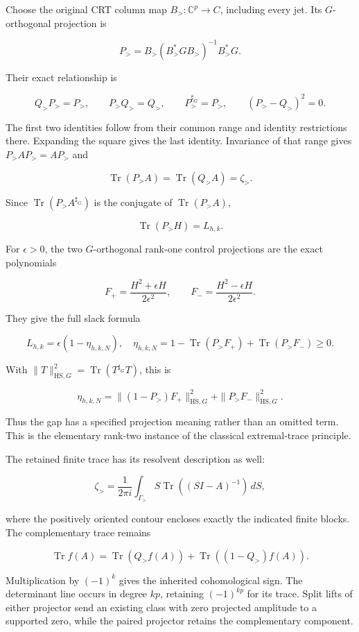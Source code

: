 \documentclass[
  11pt,
]{article}
\begin{document}
Choose the original CRT column map \(B_{>}:\mathbb C^p\to C\), including
every jet. Its \(G\)-orthogonal projection is

\[
\boxed{
P_{>}=B_{>}(B_{>}^*GB_{>})^{-1}B_{>}^*G.
}
\]

Their exact relationship is

\[
Q_{>}P_{>}=P_{>},\qquad P_{>}Q_{>}=Q_{>},\qquad
P_{>}^{\sharp_G}=P_{>},\qquad(P_{>}-Q_{>})^2=0.
\]

The first two identities follow from their common range and identity
restrictions there. Expanding the square gives the last identity.
Invariance of that range gives \(P_{>}AP_{>}=AP_{>}\) and

\[
\operatorname{Tr}(P_{>}A)=\operatorname{Tr}(Q_{>}A)=\zeta_{>}.
\]

Since \(\operatorname{Tr}(P_{>}A^{\sharp_G})\) is the conjugate of
\(\operatorname{Tr}(P_{>}A)\),

\[
\boxed{\operatorname{Tr}(P_{>}H)=L_{h,k}.}
\]

For \(\epsilon>0\), the two \(G\)-orthogonal rank-one control
projections are the exact polynomials

\[
F_+=\frac{H^2+\epsilon H}{2\epsilon^2},\qquad
F_-=\frac{H^2-\epsilon H}{2\epsilon^2}.
\]

They give the full slack formula

\[
\boxed{
L_{h,k}=\epsilon(1-\eta_{h,k,N}),
\quad
\eta_{h,k,N}=1-\operatorname{Tr}(P_{>}F_+)
                  +\operatorname{Tr}(P_{>}F_-)\geq0.
}
\]

With \(\|T\|_{\mathrm{HS},G}^2=\operatorname{Tr}(T^{\sharp_G}T)\), this
is

\[
\eta_{h,k,N}
=\|(1-P_{>})F_+\|_{\mathrm{HS},G}^2
 +\|P_{>}F_-\|_{\mathrm{HS},G}^2.
\]

Thus the gap has a specified projection meaning rather than an omitted
term. This is the elementary rank-two instance of the classical
extremal-trace principle.

The retained finite trace has its resolvent description as well:

\[
\zeta_{>}
=\frac1{2\pi i}\int_{\Gamma_{>}}
S\operatorname{Tr}((SI-A)^{-1})\,dS,
\]

where the positively oriented contour encloses exactly the indicated
finite blocks. The complementary trace remains

\[
\operatorname{Tr}f(A)
=\operatorname{Tr}(Q_{>}f(A))
 +\operatorname{Tr}((1-Q_{>})f(A)).
\]

Multiplication by \((-1)^k\) gives the inherited cohomological sign. The
determinant line occurs in degree \(kp\), retaining \((-1)^{kp}\) for
its trace. Split lifts of either projector send an existing class with
zero projected amplitude to a supported zero, while the paired projector
retains the complementary component.
\end{document}
